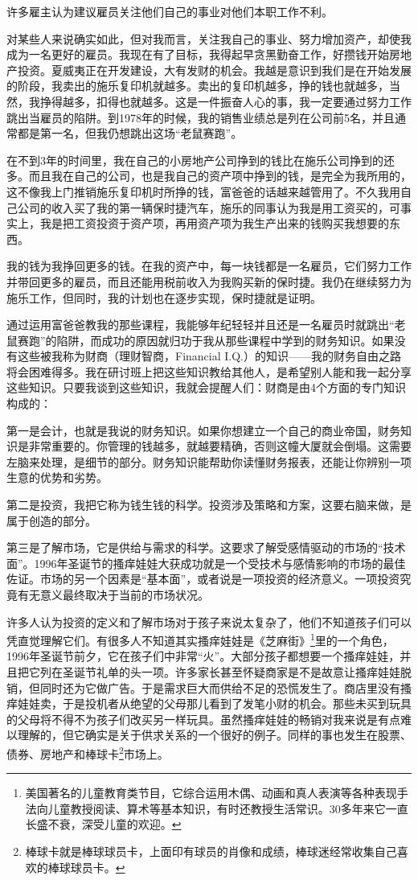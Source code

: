 许多雇主认为建议雇员关注他们自己的事业对他们本职工作不利。

对某些人来说确实如此，但对我而言，关注我自己的事业、努力增加资产，却使我成为一名更好的雇员。我现在有了目标，我得起早贪黑勤奋工作，好攒钱开始房地产投资。夏威夷正在开发建设，大有发财的机会。我越是意识到我们是在开始发展的阶段，我卖出的施乐复印机就越多。卖出的复印机越多，挣的钱也就越多，当然，我挣得越多，扣得也就越多。这是一件振奋人心的事，我一定要通过努力工作跳出当雇员的陷阱。到1978年的时候，我的销售业绩总是列在公司前5名，并且通常都是第一名，但我仍想跳出这场“老鼠赛跑”。

在不到3年的时间里，我在自己的小房地产公司挣到的钱比在施乐公司挣到的还多。而且我在自己的公司，也是我自己的资产项中挣到的钱，是完全为我所用的，这不像我上门推销施乐复印机时所挣的钱，富爸爸的话越来越管用了。不久我用自己公司的收入买了我的第一辆保时捷汽车，施乐的同事认为我是用工资买的，可事实上，我是把工资投资于资产项，再用资产项为我生产出来的钱购买我想要的东西。

我的钱为我挣回更多的钱。在我的资产中，每一块钱都是一名雇员，它们努力工作并带回更多的雇员，而且还能用税前收入为我购买新的保时捷。我仍在继续努力为施乐工作，但同时，我的计划也在逐步实现，保时捷就是证明。

通过运用富爸爸教我的那些课程，我能够年纪轻轻并且还是一名雇员时就跳出“老鼠赛跑”的陷阱，而成功的原因就归功于我从那些课程中学到的财务知识。如果没有这些被我称为财商（理财智商，Financial I.Q.）的知识——我的财务自由之路将会困难得多。我在研讨班上把这些知识教给其他人，是希望别人能和我一起分享这些知识。只要我谈到这些知识，我就会提醒人们：财商是由4个方面的专门知识构成的：

第一是会计，也就是我说的财务知识。如果你想建立一个自己的商业帝国，财务知识是非常重要的。你管理的钱越多，就越要精确，否则这幢大厦就会倒塌。这需要左脑来处理，是细节的部分。财务知识能帮助你读懂财务报表，还能让你辨别一项生意的优势和劣势。

第二是投资，我把它称为钱生钱的科学。投资涉及策略和方案，这要右脑来做，是属于创造的部分。

第三是了解市场，它是供给与需求的科学。这要求了解受感情驱动的市场的“技术面”。1996年圣诞节的搔痒娃娃大获成功就是一个受技术与感情影响的市场的最佳佐证。市场的另一个因素是“基本面”，或者说是一项投资的经济意义。一项投资究竟有无意义最终取决于当前的市场状况。

许多人认为投资的定义和了解市场对于孩子来说太复杂了，他们不知道孩子们可以凭直觉理解它们。有很多人不知道其实搔痒娃娃是《芝麻街》\footnote{美国著名的儿童教育类节目，它综合运用木偶、动画和真人表演等各种表现手法向儿童教授阅读、算术等基本知识，有时还教授生活常识。30多年来它一直长盛不衰，深受儿童的欢迎。}里的一个角色，1996年圣诞节前夕，它在孩子们中非常“火”。大部分孩子都想要一个搔痒娃娃，并且把它列在圣诞节礼单的头一项。许多家长甚至怀疑商家是不是故意让搔痒娃娃脱销，但同时还为它做广告。于是需求巨大而供给不足的恐慌发生了。商店里没有搔痒娃娃卖，于是投机者从绝望的父母那儿看到了发笔小财的机会。那些未买到玩具的父母将不得不为孩子们改买另一样玩具。虽然搔痒娃娃的畅销对我来说是有点难以理解的，但它确实是关于供求关系的一个很好的例子。同样的事也发生在股票、债券、房地产和棒球卡\footnote{棒球卡就是棒球球员卡，上面印有球员的肖像和成绩，棒球迷经常收集自己喜欢的棒球球员卡。}市场上。

